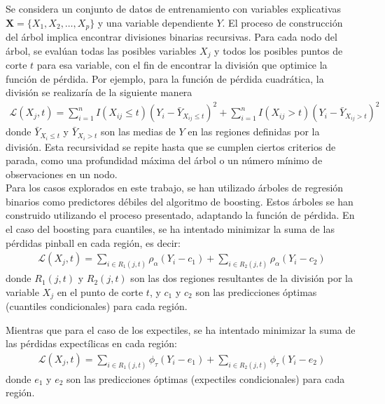 \documentclass[11pt]{book}
\theoremstyle{plain} %
\theoremstyle{definition} %
\begin{document}
Se considera un conjunto de datos de entrenamiento con variables 
explicativas $\mathbf{X} = \{X_1, X_2, \dots, X_p\}$ y una variable dependiente 
$Y$. El proceso de construcción del árbol implica encontrar divisiones 
binarias recursivas. Para cada nodo del árbol, se evalúan todas las posibles 
variables $X_j$ y todos los posibles puntos de corte $t$ para esa variable, 
con el fin de encontrar la división que optimice la función de pérdida. 
Por ejemplo, para la función de pérdida cuadrática, la división se 
realizaría de la siguiente manera
\begin{align*}
   \mathcal{L}(X_j, t) = \sum_{i=1}^n I(X_{ij} \leq t) (Y_i - \bar{Y}_{X_{ij} \leq t})^2 + \sum_{i=1}^n I(X_{ij} > t)(Y_i - \bar{Y}_{X_{ij} > t})^2
\end{align*}
donde $\bar{Y}_{X_i \leq t}$ y $\bar{Y}_{X_i > t}$ son las medias de $Y$ en las 
regiones definidas por la división. Esta recursividad se repite hasta que se 
cumplen ciertos criterios de parada, como una profundidad máxima del árbol 
o un  número mínimo de observaciones en un nodo. \\

Para los casos explorados en este trabajo, se han utilizado árboles de 
regresión binarios como predictores débiles del algoritmo de boosting. 
Estos árboles se han construido utilizando el proceso presentado, adaptando 
la función de pérdida. En el caso del boosting para cuantiles, se 
ha intentado minimizar la suma de las pérdidas pinball en cada región, es decir:
\begin{align*}
   \mathcal{L}(X_j, t) = \sum_{i \in R_1(j,t)} \rho_\alpha(Y_i - c_1) + \sum_{i \in R_2(j,t)} \rho_\alpha(Y_i - c_2)
\end{align*}
donde $R_1(j,t)$ y $R_2(j,t)$ son las dos regiones resultantes de la división por la variable 
$X_j$ en el punto de corte $t$, y $c_1$ y $c_2$ son las predicciones óptimas (cuantiles 
condicionales) para cada región.

Mientras que para el caso de los expectiles, se ha intentado minimizar la suma de las 
pérdidas expectílicas en cada región:
\begin{align*}
   \mathcal{L}(X_j, t) = \sum_{i \in R_1(j,t)} \phi_\tau(Y_i - e_1) + \sum_{i \in R_2(j,t)} \phi_\tau(Y_i - e_2)
\end{align*}
donde $e_1$ y $e_2$ son las predicciones óptimas (expectiles condicionales) para 
cada región.\\
\end{document}
